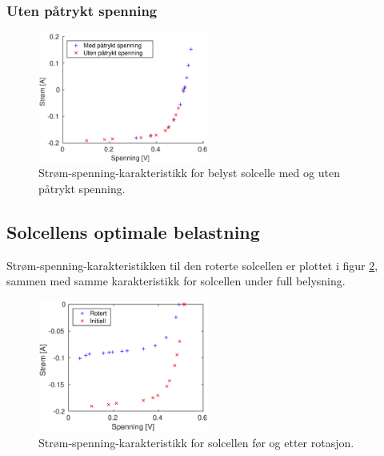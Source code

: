 \documentclass[a4paper,11pt, twocolumn]{article}
\begin{document}
\subsubsection{Uten påtrykt spenning}
\begin{figure}[!ht]
	\includegraphics[width = 0.5\textwidth]{matlab/LAB/utenSpenning.eps}
	\caption{Strøm-spenning-karakteristikk for belyst solcelle med og uten påtrykt spenning.}
	\label{fig:resMedSpenning}
\end{figure}

\subsection{Solcellens optimale belastning}
Strøm-spenning-karakteristikken til den roterte solcellen er plottet i figur \ref{fig:currentVoltageRotation}, sammen med samme karakteristikk for solcellen under full belysning.

\begin{figure}[!ht]
	\includegraphics[width = 0.5\textwidth]{matlab/LAB/currentVoltageRotated.eps}
	\caption{Strøm-spenning-karakteristikk for solcellen før og etter rotasjon.}
	\label{fig:currentVoltageRotation}
\end{figure}
\end{document}
